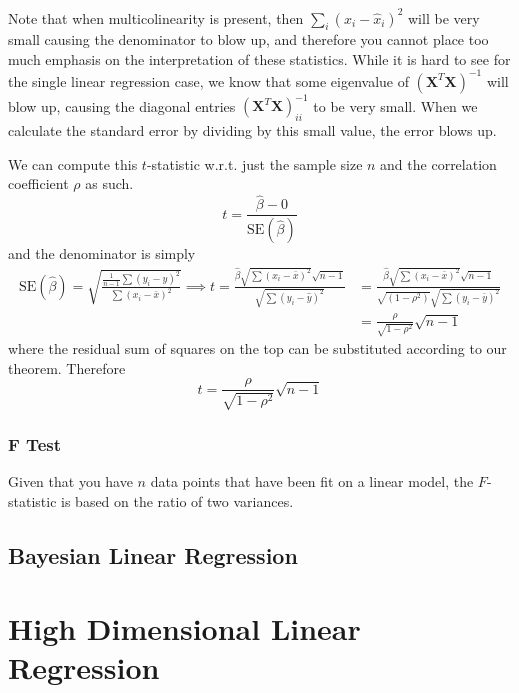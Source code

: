 \documentclass{article}
\begin{document}
      Note that when multicolinearity is present, then $\sum_{i} (x_i - \hat{x}_i)^2$ will be very small causing the denominator to blow up, and therefore you cannot place too much emphasis on the interpretation of these statistics. While it is hard to see for the single linear regression case, we know that some eigenvalue of $(\mathbf{X}^T \mathbf{X})^{-1}$ will blow up, causing the diagonal entries $(\mathbf{X}^T \mathbf{X})^{-1}_{ii}$ to be very small. When we calculate the standard error by dividing by this small value, the error blows up. 

      \begin{theorem}
      We can compute this $t$-statistic w.r.t. just the sample size $n$ and the correlation coefficient $\rho$ as such. 
      \[t = \frac{\hat{\beta} - 0}{\mathrm{SE}(\hat{\beta})}\]
      and the denominator is simply 
      \begin{align*}
        \mathrm{SE}(\hat{\beta}) = \sqrt{\frac{\frac{1}{n-1} \sum (y_i - \hat{y})^2}{\sum (x_i - \bar{x})^2}} \implies t = \frac{\hat{\beta} \sqrt{\sum (x_i - \bar{x})^2} \sqrt{n-1}}{\sqrt{\sum (y_i - \hat{y})^2}} & = \frac{\hat{\beta} \sqrt{\sum (x_i - \bar{x})^2} \sqrt{n-1}}{\sqrt{(1 - \rho^2)} \sqrt{\sum (y_i - \bar{y})^2}} \\ & = \frac{\rho}{\sqrt{1 - \rho^2}} \sqrt{n-1}
      \end{align*}
      where the residual sum of squares on the top can be substituted according to our theorem. Therefore 
      \begin{equation}
        t = \frac{\rho}{\sqrt{1 - \rho^2}} \sqrt{n-1}
      \end{equation}
      \end{theorem}

    \subsubsection{F Test}

      Given that you have $n$ data points that have been fit on a linear model, the $F$-statistic is based on the ratio of two variances. 

  \subsection{Bayesian Linear Regression} 

\section{High Dimensional Linear Regression}
\end{document}
